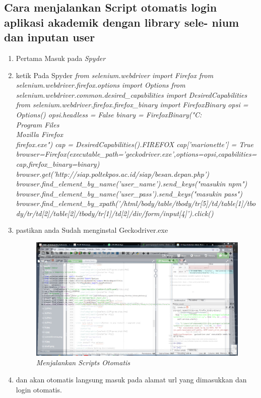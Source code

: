 \subsection{Cara menjalankan Script otomatis login aplikasi akademik dengan library sele-
nium dan inputan user}
\begin{enumerate}
    \item Pertama Masuk pada \textit{Spyder}
    \item ketik Pada Spyder \textit{ from selenium.webdriver import Firefox
    from selenium.webdriver.firefox.options import Options
    from selenium.webdriver.common.desired_capabilities import DesiredCapabilities
    from selenium.webdriver.firefox.firefox_binary import FirefoxBinary
    opsi = Options()
    opsi.headless = False
    binary = FirefoxBinary("C:\\Program Files\\Mozilla Firefox\\firefox.exe")
    cap = DesiredCapabilities().FIREFOX
    cap['marionette'] = True
    browser=Firefox(executable_path='geckodriver.exe',options=opsi,capabilities=cap,firefox_binary=binary)
    browser.get('http://siap.poltekpos.ac.id/siap/besan.depan.php')
    browser.find_element_by_name('user_name').send_keys("masukin npm")
    browser.find_element_by_name('user_pass').send_keys("masukin pass")
    browser.find_element_by_xpath('/html/body/table/tbody/tr[5]/td/table[1]/tbody/tr/td[2]/table[2]/tbody/tr[1]/td[2]/div/form/input[4]').click()}
    \item pastikan anda Sudah menginstal Geckodriver.exe
    \begin{figure}[!htbp]
    \centering
    \includegraphics[scale=0.2]{figures/27.jpg}
    \caption{\textit{Menjalankan Scripts Otomatis}}
    \label{Figurepython}
    \end{figure}
    \item dan akan otomatis langsung masuk pada alamat url yang dimasukkan dan login otomatis.
\end{enumerate}

